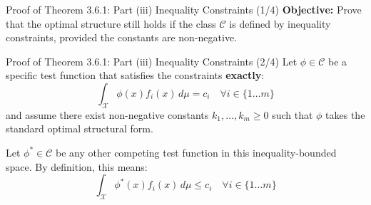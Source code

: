 \documentclass[10pt, aspectratio=169, xcolor=dvipsnames]{beamer}
\newcommand{\lead}[1]{{\color{UniBlue}\bfseries #1}}
\begin{document}
\begin{frame}{Proof of Theorem 3.6.1: Part (iii) Inequality Constraints (1/4)}
    \lead{Objective:} Prove that the optimal structure still holds if the class $\mathcal{C}$ is defined by inequality constraints, provided the constants are non-negative.
    
    \vspace{0.5cm}
    \begin{center}
    \end{center}
\end{frame}

\begin{frame}{Proof of Theorem 3.6.1: Part (iii) Inequality Constraints (2/4)}
    Let $\phi \in \mathcal{C}$ be a specific test function that satisfies the constraints \textbf{exactly}:
    \[ \int_{\mathcal{X}} \phi(x) f_i(x) \, d\mu = c_i \quad \forall i \in \{1 \dots m\} \]
    and assume there exist non-negative constants $k_1, \dots, k_m \ge 0$ such that $\phi$ takes the standard optimal structural form.
    
    \vspace{0.6cm}
    Let $\phi^* \in \mathcal{C}$ be any other competing test function in this inequality-bounded space. By definition, this means:
    \[ \int_{\mathcal{X}} \phi^*(x) f_i(x) \, d\mu \le c_i \quad \forall i \in \{1 \dots m\} \]
\end{frame}
\end{document}
